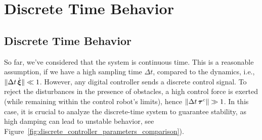 \ifthesis
\section{Discrete Time Behavior} \label{sec:discrete_time_behavior}
\else
\subsection{Discrete Time Behavior} \label{sec:discrete_time_behavior}
\fi

So far, we've considered that the system is continuous time. 
This is a reasonable assumption, if we have a high sampling time $\Delta t$, compared to the dynamics, i.e., $\| \Delta t \, \dot{\boldsymbol{\xi}} \| \ll 1$.
However, any digital controller sends a discrete control signal. To reject the disturbances in the presence of obstacles, a high control force is exerted (while remaining within the control robot's limits), hence $\| \Delta t \, \boldsymbol{\tau}^c \| \gg 1$. 
In this case, it is crucial to analyze the discrete-time system to guarantee stability, as high damping can lead to unstable behavior, see Figure~\ref{fig:discrete_controller_parameters_comparison}).


